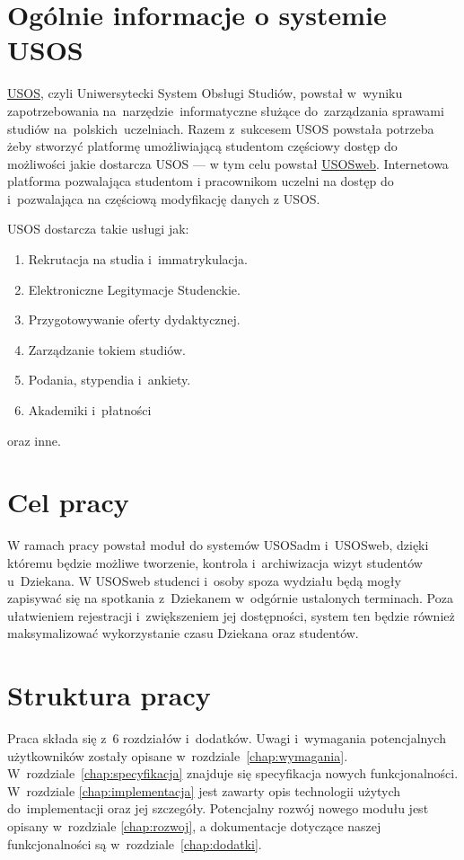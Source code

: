 \documentclass[licencjacka]{pracamgr}
\begin{document}
\section{Ogólnie informacje o systemie USOS}
\href{http://usos.edu.pl}{USOS}, czyli Uniwersytecki System Obsługi Studiów, powstał w~wyniku zapotrzebowania na~narzędzie~informatyczne służące do~zarządzania sprawami studiów na~polskich~uczelniach. Razem z~sukcesem USOS powstała potrzeba żeby stworzyć platformę umożliwiającą studentom częściowy dostęp do możliwości jakie dostarcza USOS --- w tym celu powstał \href{htpp://usosweb.uw.edu.pl}{USOSweb}. Internetowa platforma pozwalająca studentom i pracownikom uczelni na dostęp do i~pozwalająca na częściową modyfikację danych z USOS.

USOS dostarcza takie usługi jak:
\begin{enumerate}
\item Rekrutacja na studia i~immatrykulacja.
\item Elektroniczne Legitymacje Studenckie.
\item Przygotowywanie oferty dydaktycznej. 
\item Zarządzanie tokiem studiów.
\item Podania, stypendia i~ankiety.
\item Akademiki i~płatności
\end{enumerate}
oraz inne.

\section{Cel pracy}
W ramach pracy powstał moduł do systemów USOSadm i~USOSweb, dzięki któremu będzie możliwe tworzenie, kontrola i~archiwizacja wizyt studentów u~Dziekana. W USOSweb studenci i~osoby spoza wydziału będą mogły zapisywać się na spotkania z~Dziekanem w~odgórnie ustalonych terminach. Poza ułatwieniem rejestracji i~zwiększeniem jej dostępności, system ten będzie również maksymalizować wykorzystanie czasu Dziekana oraz studentów.
\section{Struktura pracy}
Praca składa się z~6 rozdziałów i~dodatków.
Uwagi i~wymagania potencjalnych użytkowników zostały opisane w~rozdziale~\ref{chap:wymagania}.
W~rozdziale~\ref{chap:specyfikacja} znajduje się specyfikacja nowych funkcjonalności. W~rozdziale \ref{chap:implementacja} jest zawarty opis technologii użytych do~implementacji oraz jej szczegóły. Potencjalny rozwój nowego modułu jest opisany w~rozdziale \ref{chap:rozwoj}, a dokumentacje dotyczące naszej funkcjonalności są w~rozdziale~\ref{chap:dodatki}. 
\end{document}

